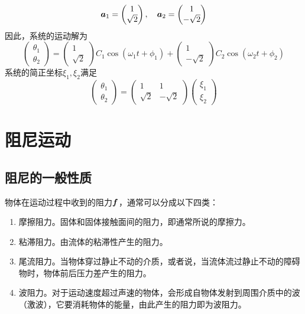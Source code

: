 \begin{example}[双摆]
\begin{equation*}
	\boldsymbol{a}_1 = \begin{pmatrix} 1 \\ \sqrt{2} \end{pmatrix},\quad \boldsymbol{a}_2 = \begin{pmatrix} 1 \\ -\sqrt{2} \end{pmatrix}
\end{equation*}
因此，系统的运动解为
\begin{equation*}
	\begin{pmatrix} \theta_1 \\ \theta_2 \end{pmatrix} = \begin{pmatrix} 1 \\ \sqrt{2} \end{pmatrix} C_1 \cos (\omega_1 t+\phi_1) + \begin{pmatrix} 1 \\ -\sqrt{2} \end{pmatrix} C_2 \cos (\omega_2 t+\phi_2)
\end{equation*}
系统的简正坐标$\xi_1,\xi_2$满足
\begin{equation*}
	\begin{pmatrix} \theta_1 \\ \theta_2 \end{pmatrix} = \begin{pmatrix} 1 & 1 \\ \sqrt{2} & -\sqrt{2} \end{pmatrix} \begin{pmatrix} \xi_1 \\ \xi_2 \end{pmatrix}
\end{equation*}
\end{example}

\section{阻尼运动}

\subsection{阻尼的一般性质}

物体在运动过程中收到的阻力$\boldsymbol{f}$，通常可以分成以下四类：
\begin{enumerate}
	\item {\heiti 摩擦阻力}。固体和固体接触面间的阻力，即通常所说的摩擦力。
	\item {\heiti 粘滞阻力}。由流体的粘滞性产生的阻力。
	\item {\heiti 尾流阻力}。当物体穿过静止不动的介质，或者说，当流体流过静止不动的障碍物时，物体前后压力差产生的阻力。
	\item {\heiti 波阻力}。对于运动速度超过声速的物体，会形成自物体发射到周围介质中的波（激波），它要消耗物体的能量，由此产生的阻力即为波阻力。
\end{enumerate}

